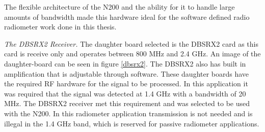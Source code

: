 The flexible architecture of the N200 and the ability for it to handle large amounts of bandwidth made this hardware ideal for the software defined radio radiometer work done in this thesis.






\emph{The DBSRX2 Receiver.}  The daughter board selected is the DBSRX2 card as this card is receive only and operates between 800 MHz and 2.4 GHz.  An image of the daughter-board can be seen in figure \ref{dbsrx2}.  The DBSRX2 also has built in amplification that is adjustable through software.  These daughter boards have the required RF hardware for the signal to be processed.  In this application it was required that the signal was detected at 1.4 GHz with a bandwidth of 20 MHz.  The DBSRX2 receiver met this requirement and was selected to be used with the N200.  In this radiometer application transmission is not needed and is illegal in the 1.4 GHz band, which is reserved for passive radiometer applications.

